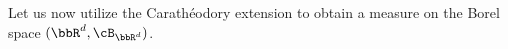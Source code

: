 Let us now utilize the Carath\'{e}odory extension to obtain a measure on the Borel space $(\bbR^d, \cB_{\bbR^d})$. 

%
%
%
%
